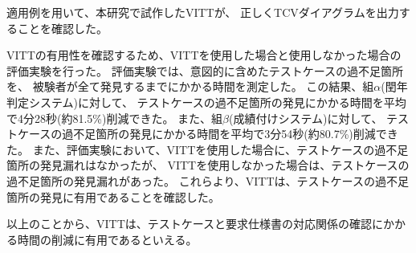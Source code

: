 \documentclass[uplatex, 10pt, a4j, dvipdfmx]{jsarticle}
\newcommand{\tool}{VITT}
\newcommand{\AbstractStandalone}{}
\begin{document}
\begin{AbstractBody}
適用例を用いて、本研究で試作した\tool{}が、
正しくTCVダイアグラムを出力することを確認した。

\tool{}の有用性を確認するため、\tool{}を使用した場合と使用しなかった場合の評価実験を行った。
評価実験では、意図的に含めたテストケースの過不足箇所を、
被験者が全て発見するまでにかかる時間を測定した。
この結果、組$\alpha$(閏年判定システム)に対して、
テストケースの過不足箇所の発見にかかる時間を平均で4分28秒(約81.5\%)削減できた。
また、組$\beta$(成績付けシステム)に対して、
テストケースの過不足箇所の発見にかかる時間を平均で3分54秒(約80.7\%)削減できた。
また、評価実験において、\tool{}を使用した場合に、テストケースの過不足箇所の発見漏れはなかったが、
\tool{}を使用しなかった場合は、テストケースの過不足箇所の発見漏れがあった。
これらより、\tool{}は、テストケースの過不足箇所の発見に有用であることを確認した。

以上のことから、\tool{}は、テストケースと要求仕様書の対応関係の確認にかかる時間の削減に有用であるといえる。

\ifdefined\AbstractStandalone
\end{AbstractBody}
\end{document}
